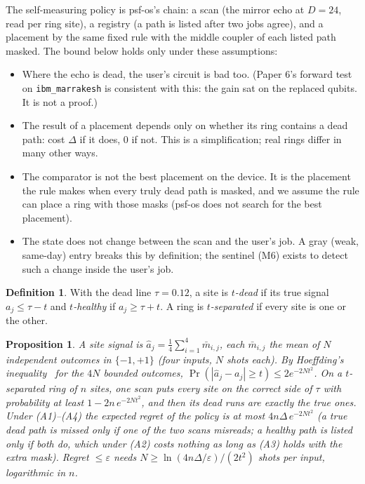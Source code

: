 \documentclass[10pt,a4paper]{article}
\newtheorem{proposition}{Proposition}
\theoremstyle{definition}
\newtheorem{definition}{Definition}
\theoremstyle{remark}
\begin{document}
The self-measuring policy is psf-os's chain: a scan (the mirror echo at $D=24$, read per ring site), a registry
(a path is listed after two jobs agree), and a placement by the same fixed rule with the middle coupler of each listed
path masked. The bound below holds only under these assumptions:
\begin{itemize}
\item[(A1)] Where the echo is dead, the user's circuit is bad too. (Paper 6's forward test on \texttt{ibm\_marrakesh}
  is consistent with this: the gain sat on the replaced qubits. It is not a proof.)
\item[(A2)] The result of a placement depends only on whether its ring contains a dead path: cost $\Delta$ if it
  does, $0$ if not. This is a simplification; real rings differ in many other ways.
\item[(A3)] The comparator is not the best placement on the device. It is the placement the rule makes when every
  truly dead path is masked, and we assume the rule can place a ring with those masks (psf-os does not search for the
  best placement).
\item[(A4)] The state does not change between the scan and the user's job. A gray (weak, same-day) entry breaks this
  by definition; the sentinel (M6) exists to detect such a change inside the user's job.
\end{itemize}

\begin{definition}
With the dead line $\tau=0.12$, a site is \emph{$t$-dead} if its true signal $a_j\le\tau-t$ and \emph{$t$-healthy} if
$a_j\ge\tau+t$. A ring is \emph{$t$-separated} if every site is one or the other.
\end{definition}

\begin{proposition}\label{prop:upper}
A site signal is $\hat a_j=\frac14\sum_{i=1}^4 \bar m_{i,j}$, each $\bar m_{i,j}$ the mean of $N$ independent outcomes
in $\{-1,+1\}$ (four inputs, $N$ shots each). By Hoeffding's inequality~\cite{hoeffding1963} for the $4N$ bounded
outcomes, $\Pr(|\hat a_j-a_j|\ge t)\le 2e^{-2Nt^2}$. On a $t$-separated ring of $n$ sites, one scan puts every site on
the correct side of $\tau$ with probability at least $1-2n\,e^{-2Nt^2}$, and then its dead runs are exactly the true
ones. Under (A1)--(A4) the expected regret of the policy is at most $4n\Delta\,e^{-2Nt^2}$ (a true dead path is missed
only if one of the two scans misreads; a healthy path is listed only if both do, which under (A2) costs nothing as long
as (A3) holds with the extra mask). Regret $\le\varepsilon$ needs $N\ge \ln(4n\Delta/\varepsilon)/(2t^2)$ shots per
input, logarithmic in $n$.
\end{proposition}
\end{document}
